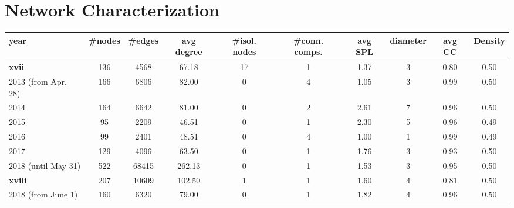 
\section{Network Characterization}
\begin{table}[ht]
\begin{tabular}{lccccccccc}

\hline
 year     &   \#nodes &   \#edges &   avg degree &   \#isol. nodes &   \#conn. comps. &   avg SPL &   diameter &   avg CC &   Density \\
\hline
 \textbf{xvii} &      136 &     4568 &        67.18 &               17 &               1 &      1.37 &          3 &     0.80 &      0.50 \\


\hline
   2013 (from Apr. 28)  &      166 &     6806 &        82.00 &              0 &               4 &      1.05 &          3 &     0.99 &      0.50 \\


   2014 &      164 &     6642 &        81.00 &              0 &               2 &      2.61 &          7 &     0.96 &      0.50 \\


   2015 &       95 &     2209 &        46.51 &              0 &               1 &      2.30 &          5 &     0.96 &      0.49 \\


   2016 &       99 &     2401 &        48.51 &              0 &               4 &      1.00 &          1 &     0.99 &      0.49 \\



   2017 &      129 &     4096 &        63.50 &              0 &               1 &      1.76 &          3 &     0.93 &      0.50 \\


   2018 (until May 31)   &      522 &    68415 &       262.13 &              0 &               1 &      1.53 &          3 &     0.95 &      0.50 \\




\hline
 \textbf{xviii} &      207 &    10609 &       102.50 &              1 &               1 &      1.60 &          4 &     0.81 &      0.50 \\






\hline
   2018 (from June 1)  &      160 &     6320 &        79.00 &              0 &               1 &      1.82 &          4 &     0.96 &      0.50 \\



\end{tabular}
\end{table}
